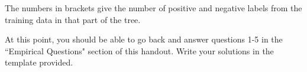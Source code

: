 The numbers in brackets give the number of positive and negative labels from the training data in that part of the tree.

\begin{notebox}
At this point, you should be able to go back and answer questions 1-5 in the ``Empirical Questions" section of this handout.  Write your solutions in the template provided. \end{notebox}

\begin{comment}
    \subsection{Evaluation}
    In addition to the politician and education datasets, our autograder will test your code on two more datasets, which will not be shown to you. One set contains information about various cars, and whether or not consumers decided to buy them. The other contains data about songs, and whether or not they became top hits. The data will be in .tsv files formatted like the ones provided, again with the class as the last column. Shown below are the attributes and the values they can take: 
    
    Music data:
    
    \begin{itemize}
    \item \texttt{Attribute:year('before1950'or'after1950')}
    \item \texttt{Attribute:solo('yes'or'no')}
    \item \texttt{Attribute:vocal('yes'or'no')}
    \item \texttt{Attribute:length('morethan3min'or'lessthan3min')}
    \item \texttt{Attribute:original('yes'or'no')}
    \item \texttt{Attribute:tempo('fast'or'slow')}
    \item \texttt{Attribute:folk('yes'or'no')}
    \item \texttt{Attribute:classical('yes'or'no')}
    \item \texttt{Attribute:rhythm('yes'or'no')}
    \item \texttt{Attribute:jazz('yes'or'no')}
    \item \texttt{Attribute:rock('yes'or'no')}
    \item \texttt{Class Label:hit('yes'or'no')}
    \end{itemize}
    
    Cars data:
    

\end{comment}
